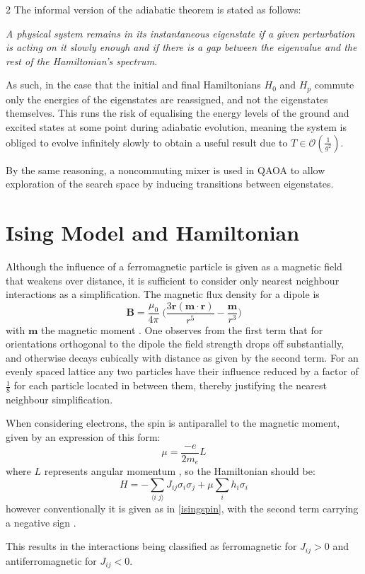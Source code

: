 \documentclass [10pt]{article}
\newcommand {\qeval}[1] {\langle #1 \rangle}
\begin{document}
\begin {multicols}{2}
The informal version of the adiabatic theorem is stated as follows:
\begin {displayquote}
\textit	{
A physical system remains in its instantaneous eigenstate if a given
perturbation is acting on it slowly enough and if there is a gap between the
eigenvalue and the rest of the Hamiltonian's spectrum. \cite{adiabatictheo}
}
\end {displayquote}

As such, in the case that the initial and final Hamiltonians $H_0$ and $H_p$
commute only the energies of the eigenstates are reassigned, and not the
eigenstates themselves. This runs the risk of equalising the energy levels of
the ground and excited states at some point during adiabatic evolution,
meaning the system is obliged to evolve infinitely slowly to obtain a
useful result due to $T \in \mathcal{O}(\frac{1}{g^2})$.

By the same reasoning, a noncommuting mixer is used in QAOA to allow
exploration of the search space by inducing transitions between eigenstates.

\section {Ising Model and Hamiltonian}
\label {ising}
Although the influence of a ferromagnetic particle is given as a magnetic
field that weakens over distance, it is sufficient to consider only nearest
neighbour interactions as a simplification.
The magnetic flux density for a dipole is
\begin {equation*}
\mathbf{B} = \frac{\mu_0}{4\pi} \; \big(\frac{3\mathbf{r(m \cdot r)}}{r^5}
- \frac{\mathbf{m}}{r^3}\big)
\end {equation*}
with $\mathbf{m}$ the magnetic moment \cite{dipoleflux}.
One observes from the first term that
for orientations orthogonal to the dipole the field strength drops off
substantially, and otherwise decays cubically with distance as given by the
second term. For an evenly spaced lattice any two particles have their influence
reduced by a factor of $\frac{1}{8}$ for each particle located in between them,
thereby justifying the nearest neighbour simplification.

When considering electrons, the spin is antiparallel to the magnetic moment,
given by an expression of this form:
\begin {equation*}
\mu = \frac{-e}{2m_e} L
\end {equation*}
where $L$ represents angular momentum \cite{mu_e}, so the Hamiltonian should be:
\begin {equation*}
H = - \sum_{\qeval{i\;j}} J_{ij} \sigma_i \sigma_j + \mu \sum_{i} h_i \sigma_i
\end {equation*}
however conventionally it is given as in \ref{isingspin}, with the second term
carrying a negative sign \cite{isingconv}.

This results in the interactions being classified as ferromagnetic for
$J_{ij} > 0$ and antiferromagnetic for $J_{ij} < 0$.

\end {multicols}
\end{document}
